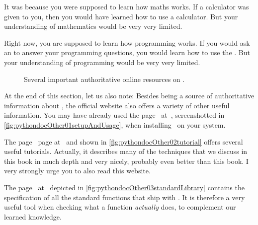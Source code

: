 \begin{noglslink}
It was because you were supposed to learn how maths works.
If a calculator was given to you, then you would have learned how to use a calculator.
But your understanding of mathematics would be very very limited.

Right now, you are supposed to learn how programming works.
If you would ask an  to answer your programming questions, you would learn how to use the .
But your understanding of programming would be very very limited.%
%
\begin{figure}%
\centering%
%
%
%
\floatSep%
%
%
%
\floatRowSep%
%
%
%
\floatSep%
%
%
%
\caption{Several important authoritative online resources on \python.}%
\label{fig:pythondoc:D}%
\end{figure}%
%
At the end of this section, let us also note:
Besides being a source of authoritative information about \python, the official website  also offers a variety of other useful information.
You may have already used the  page~\cite{PSF:P3D:PSAU} at~, screenshotted in \cref{fig:pythondocOther01setupAndUsage}, when installing \python\ on your system.

The  page~\cite{PSF:P3D:TPT} page at~ and shown in \cref{fig:pythondocOther02tutorial} offers several useful tutorials.
Actually, it describes many of the techniques that we discuss in this book in much depth and very nicely, probably even better than this book.
I very strongly urge you to also read this website.

The  page~\cite{PSF:P3D:TPSL} at~ depicted in \cref{fig:pythondocOther03standardLibrary} contains the specification of all the standard functions that ship with \python.
It is therefore a very useful tool when checking what a function \emph{actually} does, to complement our learned knowledge.


\end{noglslink}
